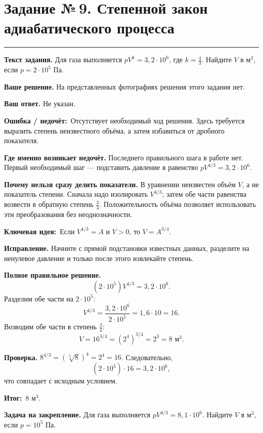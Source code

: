\documentclass[a4paper,11pt]{article}
\newcommand{\rlabel}[1]{\par\noindent\textbf{\color{darkaccent}#1}\quad}
\newcommand{\errorlabel}{\textcolor{err}{\textbf{Ошибка / недочёт:}}}
\newcommand{\keylabel}{\textcolor{blue!60!black}{\textbf{Ключевая идея:}}}
\newcommand{\finallabel}{\textcolor{teal!60!black}{\textbf{Итог:}}}
\newcommand{\tasktitle}[2]{\clearpage\phantomsection\label{task:#1}\section*{Задание №\,#1. #2}\vspace{-3mm}\textcolor{accent}{\rule{\linewidth}{0.45pt}}}
\begin{document}
\tasktitle{9}{Степенной закон адиабатического процесса}
\rlabel{Текст задания.} Для газа выполняется $pV^k=3{,}2\cdot10^6$, где $k=\frac43$. Найдите $V$ в м$^3$, если $p=2\cdot10^5$ Па.
\rlabel{Ваше решение.} На представленных фотографиях решения этого задания нет.
\rlabel{Ваш ответ.} Не указан.
\par\noindent\errorlabel\ Отсутствует необходимый ход решения. Здесь требуется выразить степень неизвестного объёма, а затем избавиться от дробного показателя.
\rlabel{Где именно возникает недочёт.} Последнего правильного шага в работе нет. Первый необходимый шаг --- подставить давление в равенство $pV^{4/3}=3{,}2\cdot10^6$.
\rlabel{Почему нельзя сразу делить показатели.} В уравнении неизвестен объём $V$, а не показатель степени. Сначала надо изолировать $V^{4/3}$; затем обе части равенства возвести в обратную степень $\frac34$. Положительность объёма позволяет использовать эти преобразования без неоднозначности.
\par\noindent\keylabel\ Если $V^{4/3}=A$ и $V>0$, то $V=A^{3/4}$.
\rlabel{Исправление.} Начните с прямой подстановки известных данных, разделите на ненулевое давление и только после этого извлекайте степень.
\rlabel{Полное правильное решение.}
\[
(2\cdot10^5)V^{4/3}=3{,}2\cdot10^6.
\]
Разделим обе части на $2\cdot10^5$:
\[
V^{4/3}=\frac{3{,}2\cdot10^6}{2\cdot10^5}
=1{,}6\cdot10=16.
\]
Возводим обе части в степень $\frac34$:
\[
V=16^{3/4}=(2^4)^{3/4}=2^3=8\text{ м}^3.
\]
\rlabel{Проверка.} $8^{4/3}=(\sqrt[3]{8})^4=2^4=16$. Следовательно,
\[
(2\cdot10^5)\cdot16=3{,}2\cdot10^6,
\]
что совпадает с исходным условием.
\par\noindent\finallabel\ $\boxed{8\text{ м}^3}$.
\rlabel{Задача на закрепление.} Для газа выполняется $pV^{4/3}=8{,}1\cdot10^6$. Найдите $V$ в м$^3$, если $p=10^5$ Па.
\end{document}
